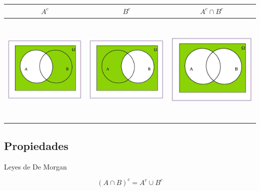 \documentclass[]{book}
\begin{document}
\begin{longtable}[]{@{}ccc@{}}
\toprule
\(A^c\) & \(B^c\) & \(A^c\cap B^c\)\tabularnewline
\midrule
\endhead
\includegraphics[width=\textwidth,height=2.08333in]{Images/proba1dibujos/demorgan8.jpg} & \includegraphics[width=\textwidth,height=2.08333in]{Images/proba1dibujos/demorgan9.jpg} & \includegraphics[width=\textwidth,height=2.08333in]{Images/proba1dibujos/demorgan10.jpg}\tabularnewline
\bottomrule
\end{longtable}

\hypertarget{propiedades-6}{%
\subsection{Propiedades}\label{propiedades-6}}

Leyes de De Morgan

\[(A\cap B)^c=A^c\cup B^c\]
\end{document}
